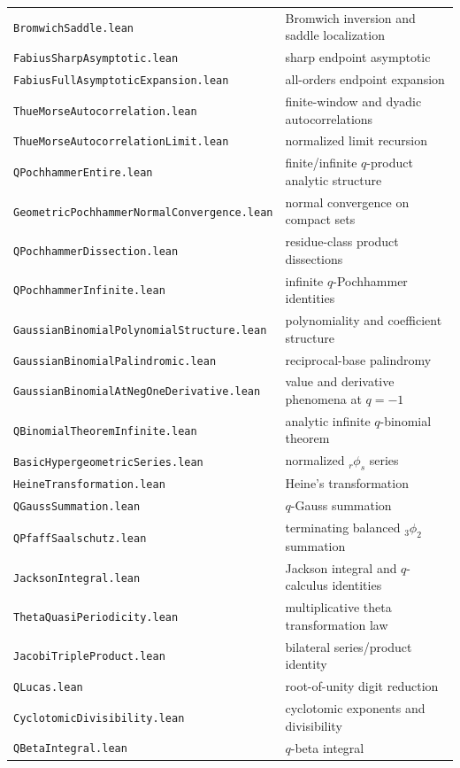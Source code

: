 \documentclass[11pt,oneside]{article}
\begin{document}
\begin{longtable}{@{}>{\raggedright\arraybackslash}p{}>{\raggedright\arraybackslash}p{}@{}}
\nolinkurl{BromwichSaddle.lean} & Bromwich inversion and saddle localization \\
\nolinkurl{FabiusSharpAsymptotic.lean} & sharp endpoint asymptotic \\
\nolinkurl{FabiusFullAsymptoticExpansion.lean} & all-orders endpoint expansion \\
\nolinkurl{ThueMorseAutocorrelation.lean} & finite-window and dyadic autocorrelations \\
\nolinkurl{ThueMorseAutocorrelationLimit.lean} & normalized limit recursion \\
\nolinkurl{QPochhammerEntire.lean} & finite/infinite \(q\)-product analytic structure \\
\nolinkurl{GeometricPochhammerNormalConvergence.lean} & normal convergence on compact sets \\
\nolinkurl{QPochhammerDissection.lean} & residue-class product dissections \\
\nolinkurl{QPochhammerInfinite.lean} & infinite \(q\)-Pochhammer identities \\
\nolinkurl{GaussianBinomialPolynomialStructure.lean} & polynomiality and coefficient structure \\
\nolinkurl{GaussianBinomialPalindromic.lean} & reciprocal-base palindromy \\
\nolinkurl{GaussianBinomialAtNegOneDerivative.lean} & value and derivative phenomena at \(q=-1\) \\
\nolinkurl{QBinomialTheoremInfinite.lean} & analytic infinite \(q\)-binomial theorem \\
\nolinkurl{BasicHypergeometricSeries.lean} & normalized \({}_r\phi_s\) series \\
\nolinkurl{HeineTransformation.lean} & Heine's transformation \\
\nolinkurl{QGaussSummation.lean} & \(q\)-Gauss summation \\
\nolinkurl{QPfaffSaalschutz.lean} & terminating balanced \({}_3\phi_2\) summation \\
\nolinkurl{JacksonIntegral.lean} & Jackson integral and \(q\)-calculus identities \\
\nolinkurl{ThetaQuasiPeriodicity.lean} & multiplicative theta transformation law \\
\nolinkurl{JacobiTripleProduct.lean} & bilateral series/product identity \\
\nolinkurl{QLucas.lean} & root-of-unity digit reduction \\
\nolinkurl{CyclotomicDivisibility.lean} & cyclotomic exponents and divisibility \\
\nolinkurl{QBetaIntegral.lean} & \(q\)-beta integral \\
\bottomrule\end{longtable}\endgroup
\end{document}
